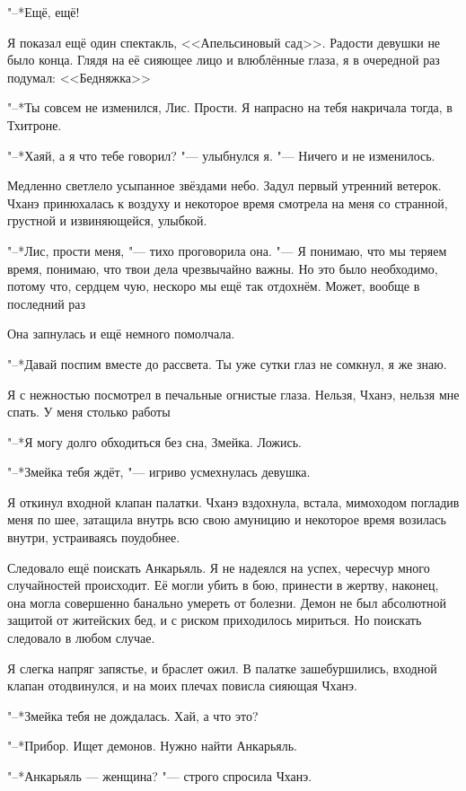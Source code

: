 \documentclass[a4paper,10pt]{book}
\newcommand{\ldotst}{\so{...}\xspace}
\begin{document}
"--*Ещё, ещё!

Я показал ещё один спектакль, <<Апельсиновый сад>>. Радости девушки не было 
конца. Глядя на её сияющее лицо и влюблённые глаза, я в очередной раз подумал: 
<<Бедняжка\ldotst>>

"--*Ты совсем не изменился, Лис. Прости. Я напрасно на тебя накричала тогда, в 
Тхитроне.

"--*Хаяй, а я что тебе говорил? "--- улыбнулся я. "--- Ничего и не изменилось.

Медленно светлело усыпанное звёздами небо. Задул первый утренний ветерок. Чханэ 
принюхалась к воздуху и некоторое время смотрела на меня со странной, грустной 
и извиняющейся, улыбкой.

"--*Лис, прости меня, "--- тихо проговорила она. "--- Я понимаю, что мы теряем 
время, понимаю, что твои дела чрезвычайно важны. Но это было необходимо, потому 
что, сердцем чую, нескоро мы ещё так отдохнём. Может, вообще в последний 
раз\ldotst

Она запнулась и ещё немного помолчала.

"--*Давай поспим вместе до рассвета. Ты уже сутки глаз не сомкнул, я же знаю.

Я с нежностью посмотрел в печальные огнистые глаза. Нельзя, Чханэ, нельзя мне 
спать. У меня столько работы\ldotst

"--*Я могу долго обходиться без сна, Змейка. Ложись.

"--*Змейка тебя ждёт, "--- игриво усмехнулась девушка.

Я откинул входной клапан палатки. Чханэ вздохнула, встала, мимоходом погладив 
меня по шее, затащила внутрь всю свою амуницию и некоторое время возилась 
внутри, устраиваясь поудобнее.

Следовало ещё поискать Анкарьяль. Я не надеялся на успех, чересчур много 
случайностей происходит. Её могли убить в бою, принести в жертву, наконец, она 
могла совершенно банально умереть от болезни. Демон не был абсолютной защитой 
от житейских бед, и с риском приходилось мириться. Но поискать следовало в 
любом случае.

Я слегка напряг запястье, и браслет ожил. В палатке зашебуршились, входной 
клапан отодвинулся, и на моих плечах повисла сияющая Чханэ.

"--*Змейка тебя не дождалась. Хай, а что это?

"--*Прибор. Ищет демонов. Нужно найти Анкарьяль.

"--*Анкарьяль — женщина? "--- строго спросила Чханэ.
\end{document}
